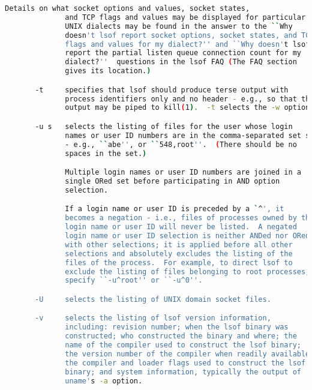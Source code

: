 {{\begin{lstlisting}[language=bash]
              Details on what socket options and values, socket states,
              and TCP flags and values may be displayed for particular
              UNIX dialects may be found in the answer to the ``Why
              doesn't lsof report socket options, socket states, and TCP
              flags and values for my dialect?'' and ``Why doesn't lsof
              report the partial listen queue connection count for my
              dialect?''  questions in the lsof FAQ (The FAQ section
              gives its location.)

       -t     specifies that lsof should produce terse output with
              process identifiers only and no header - e.g., so that the
              output may be piped to kill(1).  -t selects the -w option.

       -u s   selects the listing of files for the user whose login
              names or user ID numbers are in the comma-separated set s
              - e.g., ``abe'', or ``548,root''.  (There should be no
              spaces in the set.)

              Multiple login names or user ID numbers are joined in a
              single ORed set before participating in AND option
              selection.

              If a login name or user ID is preceded by a `^', it
              becomes a negation - i.e., files of processes owned by the
              login name or user ID will never be listed.  A negated
              login name or user ID selection is neither ANDed nor ORed
              with other selections; it is applied before all other
              selections and absolutely excludes the listing of the
              files of the process.  For example, to direct lsof to
              exclude the listing of files belonging to root processes,
              specify ``-u^root'' or ``-u^0''.

       -U     selects the listing of UNIX domain socket files.

       -v     selects the listing of lsof version information,
              including: revision number; when the lsof binary was
              constructed; who constructed the binary and where; the
              name of the compiler used to construct the lsof binary;
              the version number of the compiler when readily available;
              the compiler and loader flags used to construct the lsof
              binary; and system information, typically the output of
              uname's -a option.


\end{lstlisting}}}
